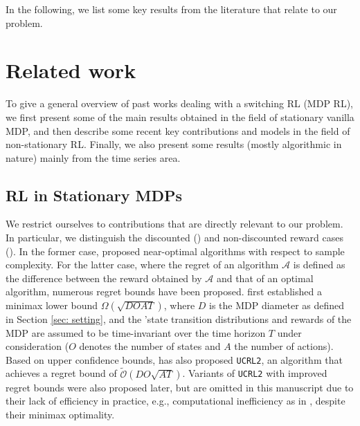 \documentclass{article} %
\begin{document}

In the following, we list some key results from the literature that relate to our problem.

\section{Related work}
To give a general overview  of past works dealing with a switching RL (MDP RL), we first present some of the main results obtained in the field of stationary vanilla MDP, and then describe some recent key contributions and models in the field of non-stationary RL. Finally, we also present some results (mostly algorithmic in nature) mainly from the time series area.

\vspace{-1em}

\subsection{RL in Stationary MDPs}
We restrict ourselves to contributions that are directly relevant to our problem. In particular, we distinguish the discounted (\cite{sidford2018near, sidford2018variance, wang2020randomized}) and non-discounted reward cases (\cite{auer2008near, azar2017minimax, dann2017unifying, jin2018q, zanette2019tighter}). In the former case, \cite{sidford2018near, sidford2018variance, wang2020randomized} proposed near-optimal algorithms with respect to sample complexity. For the latter case, where the regret of an algorithm $\mathcal{A}$ is defined as the difference between the reward obtained by $\mathcal{A}$ and that of an optimal algorithm, numerous regret bounds have been proposed. \cite{auer2008near} first established a minimax lower bound $\Omega(\sqrt{D O A T})$, where $D$ is the MDP diameter as defined in Section \ref{sec: setting}, and the 'state transition distributions and rewards of the MDP are assumed to be time-invariant over the time horizon $T$ under consideration ($O$ denotes the number of states and $A$ the number of actions). Based on upper confidence bounds, \cite{auer2008near} has also proposed \texttt{UCRL2}, an algorithm that achieves a regret bound of $\tilde{\mathcal{O}} (D O \sqrt{A T})$. Variants of \texttt{UCRL2} with improved regret bounds were also proposed later, but are omitted in this manuscript due to their lack of efficiency in practice, e.g., computational inefficiency as in \cite{zhang2019regret}, despite their minimax optimality. 
\end{document}

